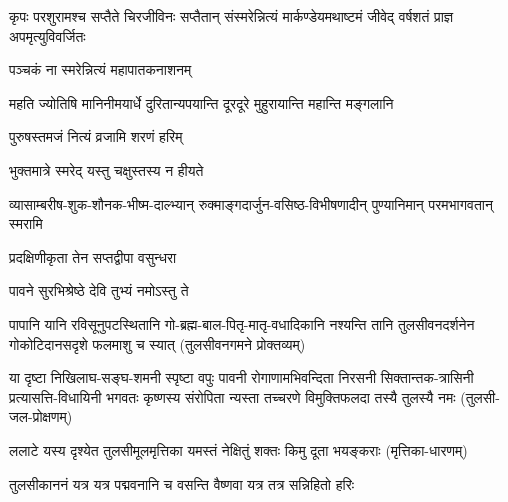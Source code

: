 
{कृपः परशुरामश्च सप्तैते चिरजीविनः}
{सप्तैतान् संस्मरेन्नित्यं मार्कण्डेयमथाष्टमं}
{जीवेद् वर्षशतं प्राज्ञ अपमृत्युविवर्जितः}

{पञ्चकं ना स्मरेन्नित्यं महापातकनाशनम्}

{महति ज्योतिषि मानिनीमयार्धे}
{दुरितान्यपयान्ति दूरदूरे}
{मुहुरायान्ति महान्ति मङ्गलानि}


{पुरुषस्तमजं नित्यं व्रजामि शरणं हरिम्}


{भुक्तमात्रे स्मरेद् यस्तु चक्षुस्तस्य न हीयते}



{व्यासाम्बरीष-शुक-शौनक-भीष्म-दाल्भ्यान्}
{रुक्माङ्गदार्जुन-वसिष्ठ-विभीषणादीन्}
{पुण्यानिमान् परमभागवतान् स्मरामि}



{प्रदक्षिणीकृता तेन सप्तद्वीपा वसुन्धरा}

{पावने सुरभिश्रेष्ठे देवि तुभ्यं नमोऽस्तु ते}

\closesub

\fourlineindentedshloka
{पापानि यानि रविसूनुपटस्थितानि}
{गो-ब्रह्म-बाल-पितृ-मातृ-वधादिकानि}
{नश्यन्ति तानि तुलसीवनदर्शनेन}
{गोकोटिदानसदृशे फलमाशु च स्यात्}
{(तुलसीवनगमने प्रोक्तव्यम्)}

\fourlineindentedshloka
{या दृष्टा निखिलाघ-सङ्घ-शमनी स्पृष्टा वपुः पावनी}
{रोगाणामभिवन्दिता निरसनी सिक्तान्तक-त्रासिनी}
{प्रत्यासत्ति-विधायिनी भगवतः कृष्णस्य संरोपिता}
{न्यस्ता तच्चरणे विमुक्तिफलदा तस्यै तुलस्यै नमः}
(तुलसी-जल-प्रोक्षणम्)

\twolineshloka
{ललाटे यस्य दृश्येत तुलसीमूलमृत्तिका}
{यमस्तं नेक्षितुं शक्तः किमु दूता भयङ्कराः}
(मृत्तिका-धारणम्)

\twolineshloka
{तुलसीकाननं यत्र यत्र पद्मवनानि च}
{वसन्ति वैष्णवा यत्र तत्र सन्निहितो हरिः}

